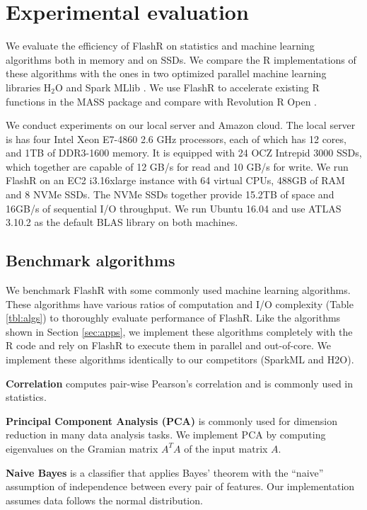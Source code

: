 \section{Experimental evaluation}
We evaluate the efficiency of FlashR on statistics and machine learning
algorithms both in memory and on SSDs. We compare the R implementations of
these algorithms with the ones in two optimized parallel machine learning
libraries H$_2$O \cite{h2o} and Spark MLlib \cite{mllib}. We use FlashR
to accelerate existing R functions in the MASS package and compare with
Revolution R Open \cite{rro}.

We conduct experiments on our local server and Amazon cloud. The local server
is has four Intel Xeon E7-4860 2.6 GHz processors,
each of which has 12 cores, and 1TB of DDR3-1600 memory. It is equipped
with 24 OCZ Intrepid 3000 SSDs, which together are capable of 12 GB/s for read
and 10 GB/s for write. We run FlashR on an EC2 i3.16xlarge instance
with 64 virtual CPUs, 488GB of RAM and 8 NVMe SSDs. The NVMe SSDs together
provide 15.2TB of space and 16GB/s of sequential I/O throughput.
We run Ubuntu 16.04 and use ATLAS 3.10.2 as the default BLAS library on both
machines.

\subsection{Benchmark algorithms}\label{benchalg}
We benchmark FlashR with some commonly used machine learning algorithms.
These algorithms have various ratios of computation and I/O complexity
(Table \ref{tbl:algs}) to thoroughly evaluate performance of FlashR.
Like the algorithms
shown in Section \ref{sec:apps}, we implement these algorithms completely with
the R code and rely on FlashR to execute them in parallel and out-of-core.
We implement these algorithms identically to our competitors (SparkML and H2O). 

\noindent \textbf{Correlation} computes pair-wise Pearson's correlation
\cite{cor} and is commonly used in statistics.

\noindent \textbf{Principal Component Analysis (PCA)} is commonly used for
dimension reduction
in many data analysis tasks. We implement PCA by computing eigenvalues on the Gramian
matrix $A^T A$ of the input matrix $A$.

\noindent \textbf{Naive Bayes} is a classifier that applies Bayes' theorem
with the ``naive'' assumption of independence between every pair of features.
Our implementation assumes data follows the normal distribution.

